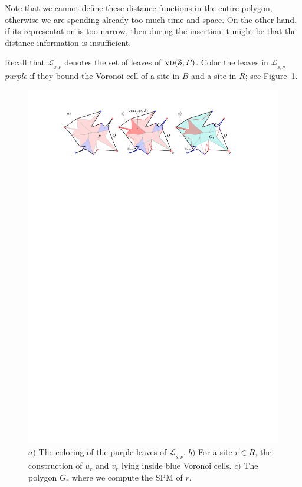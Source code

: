 \documentclass[a4paper,UKenglish]{socg-lipics-v2018}
\newcommand{\s}{\mathcal S}
\newcommand{\vd}[2][P]{\textsc{vd}(#2, #1)}
\newcommand{\LL}[1][\s, P]{\ensuremath{\mathcal L_{_{#1}}}}
\begin{document}
Note that we cannot define these distance functions in the entire polygon, otherwise we are spending already too much time and space.
On the other hand, if its representation is too narrow, then during the insertion it might be that the distance information is insufficient.

Recall that $\LL$ denotes the set of leaves of $\vd{\s}$.
Color the leaves in $\LL$ \emph{purple} if they bound the Voronoi cell of a site in $B$ and a site in $R$; see Figure~\ref{fig:RedPreprocessing}.


\begin{figure}[ht]
\centering
\includegraphics{imgRedPreprocessing.pdf}
\caption{$a)$ The coloring of the purple leaves of $\LL$.
$b)$ For a site $r\in R$, the construction of $u_r$ and $v_r$ lying inside blue Voronoi cells.
$c)$ The polygon $G_r$ where we compute the SPM of $r$.}
\label{fig:RedPreprocessing}
\end{figure}
\end{document}
